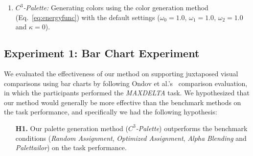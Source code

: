 \begin{enumerate}
     \item \emph{$C^3$-Palette:} Generating  colors using the  color generation method (Eq.~\ref{eq:energyfunc}) with the default settings ($\omega_0=1.0$, $\omega_1=1.0$, $\omega_2=1.0$ and $\kappa=0$).
\end{enumerate}


\subsection{Experiment 1: Bar Chart Experiment}
\label{subsec:barchartExp}
We evaluated the effectiveness of our method on supporting juxtaposed visual comparisons using bar charts by following Ondov et al.'s~\cite{Ondov19} comparison evaluation, in which the participants performed the \emph{MAXDELTA} task.
We hypothesized that our method would generally be more effective than the benchmark methods on the task performance, and specifically we had the following hypothesis:
\begin{itemize}[noitemsep]
\setlength{\itemsep}{5pt}
    \item[\textbf{H1.}] Our palette generation method (\emph{$C^3$-Palette}) outperforms the benchmark conditions (\emph{Random Assignment}, \emph{Optimized Assignment}, \emph{Alpha Blending} and \emph{Palettailor}) on the task performance.
\end{itemize}

